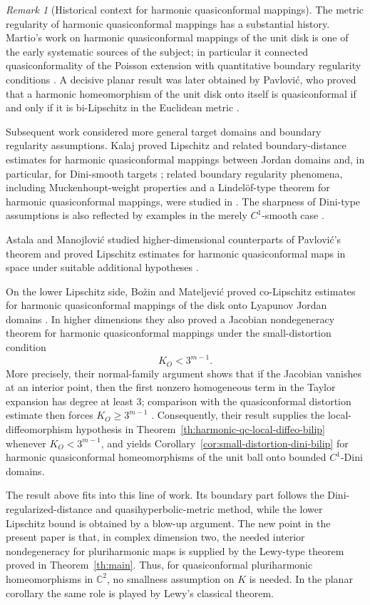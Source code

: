 \documentclass[11pt]{amsart}
\theoremstyle{definition}
\theoremstyle{remark}
\newtheorem{remark}[theorem]{Remark}
\newcommand{\C}{\mathbb C}
\begin{document}
\begin{remark}[Historical context for harmonic quasiconformal mappings]
\label{rem:historical-hqc}
The metric regularity of harmonic quasiconformal mappings has a substantial
history. Martio's work on harmonic quasiconformal mappings of the unit disk
is one of the early systematic sources of the subject; in particular it
connected quasiconformality of the Poisson extension with quantitative
boundary regularity conditions \cite{Martio1969}. A decisive planar result
was later obtained by Pavlovi\'c, who proved that a harmonic homeomorphism of
the unit disk onto itself is quasiconformal if and only if it is
bi-Lipschitz in the Euclidean metric \cite{Pavlovic2002}.

Subsequent work considered more general target domains and boundary
regularity assumptions. Kalaj proved Lipschitz and related boundary-distance
estimates for harmonic quasiconformal mappings between Jordan domains and,
in particular, for Dini-smooth targets \cite{Kalaj2008,Kalaj2015Dini};
related boundary regularity phenomena, including Muckenhoupt-weight
properties and a Lindel\"of-type theorem for harmonic quasiconformal
mappings, were studied in \cite{Kalaj2015AIM}. The sharpness of
Dini-type assumptions is also reflected by examples in the merely
\(C^1\)-smooth case \cite{Kalaj2022RMI}.

 Astala and Manojlovi\'c
studied higher-dimensional counterparts of Pavlovi\'c's theorem and proved
Lipschitz estimates for harmonic quasiconformal maps in space under suitable
additional hypotheses \cite{AstalaManojlovic2015}.

On the lower Lipschitz side, Bo\v zin and Mateljevi\'c proved
co-Lipschitz estimates for harmonic quasiconformal mappings of the disk onto
Lyapunov Jordan domains \cite{BozinMateljevic2020}. In higher dimensions
they also proved a Jacobian nondegeneracy theorem for harmonic
quasiconformal mappings under the small-distortion condition
\[
        K_O<3^{m-1}.
\]
More precisely, their normal-family argument shows that if the Jacobian
vanishes at an interior point, then the first nonzero homogeneous term in
the Taylor expansion has degree at least \(3\); comparison with the
quasiconformal distortion estimate then forces \(K_O\ge 3^{m-1}\)
\cite{BozinMateljevic2015}. Consequently, their result supplies the
local-diffeomorphism hypothesis in
Theorem~\ref{th:harmonic-qc-local-diffeo-bilip} whenever
\(K_O<3^{m-1}\), and yields
Corollary~\ref{cor:small-distortion-dini-bilip} for harmonic
quasiconformal homeomorphisms of the unit ball onto bounded \(C^1\)-Dini
domains.

The result above fits into this line of work. Its boundary part follows the
Dini-regularized-distance and quasihyperbolic-metric method, while the lower
Lipschitz bound is obtained by a blow-up argument. The new point in the
present paper is that, in complex dimension two, the needed interior
nondegeneracy for pluriharmonic maps is supplied by the Lewy-type theorem
proved in Theorem~\ref{th:main}. Thus, for quasiconformal pluriharmonic
homeomorphisms in \(\C^2\), no smallness assumption on \(K\) is needed. In
the planar corollary the same role is played by Lewy's classical theorem.
\end{remark}
\end{document}
